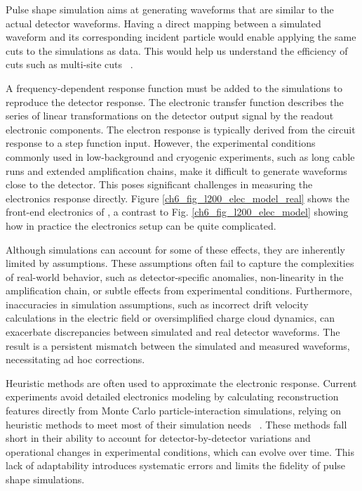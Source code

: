 Pulse shape simulation aims at generating waveforms that are similar to the actual detector waveforms. Having a direct mapping between a simulated waveform and its corresponding incident particle would enable applying the same cuts to the simulations as data. This would help us understand the efficiency of cuts such as multi-site cuts ~\cite{AvsE}.  


A frequency-dependent response function must be added to the simulations to reproduce the detector response. The electronic transfer function describes the series of linear transformations on the detector output signal by the readout electronic components. The electron response is typically derived from the circuit response to a step function input. However, the experimental conditions commonly used in low-background and cryogenic experiments, such as long cable runs and extended amplification chains, make it difficult to generate waveforms close to the detector. This poses significant challenges in measuring the electronics response directly. Figure \ref{ch6_fig_l200_elec_model_real} shows the front-end electronics of {\Ltwo}, a contrast to Fig. \ref{ch6_fig_l200_elec_model} showing how in practice the electronics setup can be quite complicated.

Although simulations can account for some of these effects, they are inherently limited by assumptions. These assumptions often fail to capture the complexities of real-world behavior, such as detector-specific anomalies, non-linearity in the amplification chain, or subtle effects from experimental conditions. Furthermore, inaccuracies in simulation assumptions, such as incorrect drift velocity calculations in the electric field or oversimplified charge cloud dynamics, can exacerbate discrepancies between simulated and real detector waveforms. The result is a persistent mismatch between the simulated and measured waveforms, necessitating ad hoc corrections. 

Heuristic methods are often used to approximate the electronic response. Current experiments avoid detailed electronics modeling by calculating reconstruction features directly from Monte Carlo particle-interaction simulations, relying on heuristic methods to meet most of their simulation needs ~\cite{Ben_Thesis,Sam_Thesis}. These methods fall short in their ability to account for detector-by-detector variations and operational changes in experimental conditions, which can evolve over time. This lack of adaptability introduces systematic errors and limits the fidelity of pulse shape simulations.


